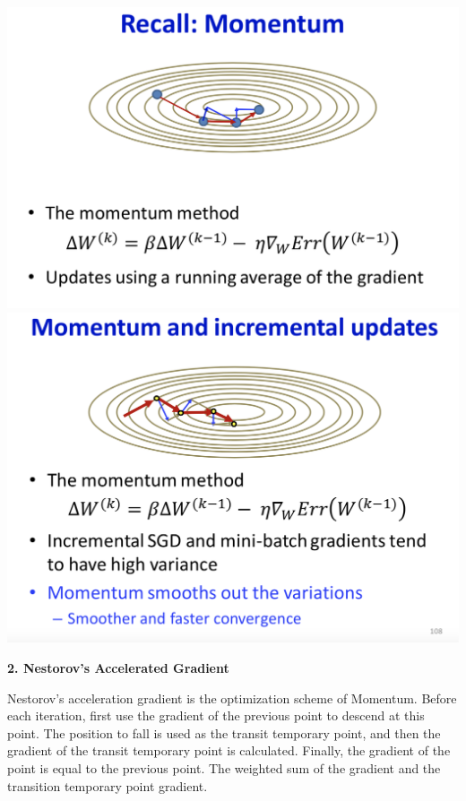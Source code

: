 \documentclass{article}
\begin{document}
	\includegraphics[scale=0.2]{93.png}
	\includegraphics[scale=0.2]{94.png}
	
	\textbf{2. Nestorov’s Accelerated Gradient}
	
	Nestorov's acceleration gradient is the optimization scheme of Momentum. Before each iteration, first use the gradient of the previous point to descend at this point. The position to fall is used as the transit temporary point, and then the gradient of the transit temporary point is calculated. Finally, the gradient of the point is equal to the previous point. The weighted sum of the gradient and the transition temporary point gradient.
	
\end{document}
